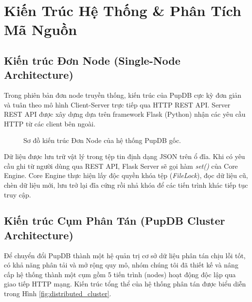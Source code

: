 \documentclass[12pt,a4paper]{report}
\begin{document}
\newpage

\chapter{Kiến Trúc Hệ Thống \& Phân Tích Mã Nguồn}
\section{Kiến trúc Đơn Node (Single-Node Architecture)}
Trong phiên bản đơn node truyền thống, kiến trúc của PupDB cực kỳ đơn giản và tuân theo mô hình Client-Server trực tiếp qua HTTP REST API. Server REST API được xây dựng dựa trên framework Flask (Python) nhận các yêu cầu HTTP từ các client bên ngoài. 

\begin{figure}[h]
    \centering
    \caption{Sơ đồ kiến trúc Đơn Node của hệ thống PupDB gốc.}
    \label{fig:single_node}
\end{figure}

Dữ liệu được lưu trữ vật lý trong tệp tin định dạng JSON trên ổ đĩa. Khi có yêu cầu ghi từ người dùng qua REST API, Flask Server sẽ gọi hàm \textit{set()} của Core Engine. Core Engine thực hiện lấy độc quyền khóa tệp (\textit{FileLock}), đọc dữ liệu cũ, chèn dữ liệu mới, lưu trở lại đĩa cứng rồi nhả khóa để các tiến trình khác tiếp tục truy cập.

\section{Kiến trúc Cụm Phân Tán (PupDB Cluster Architecture)}
Để chuyển đổi PupDB thành một hệ quản trị cơ sở dữ liệu phân tán chịu lỗi tốt, có khả năng phân tải và mở rộng quy mô, nhóm chúng tôi đã thiết kế và nâng cấp hệ thống thành một cụm gồm 5 tiến trình (nodes) hoạt động độc lập qua giao tiếp HTTP mạng. Kiến trúc tổng thể của hệ thống phân tán được biểu diễn trong Hình \ref{fig:distributed_cluster}.
\end{document}
